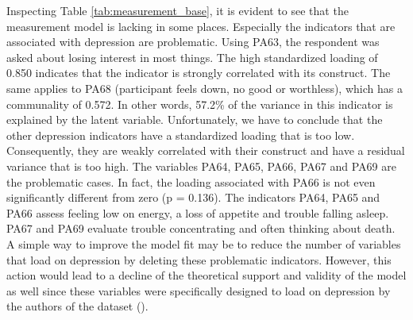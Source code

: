 \documentclass[11pt]{article}
\begin{document}
Inspecting Table \ref{tab:measurement_base}, it is evident to see that the
measurement model is lacking in some places. Especially the indicators that are
associated with depression are problematic.
Using PA63, the respondent was asked about losing interest in most things. The
high standardized loading of 0.850 indicates that the indicator is strongly
correlated with its construct. The same applies to PA68 (participant feels down,
no good or worthless), which has a communality of 0.572. In other words, 57.2\%
of the variance in this indicator is explained by the latent variable.
Unfortunately, we have to conclude that the other depression indicators have a
standardized loading that is too low. Consequently, they are weakly correlated
with their construct and have a residual variance that is too high. 
The variables PA64, PA65, PA66, PA67 and PA69 are the problematic cases. In
fact, the loading associated with PA66 is not even significantly different from
zero (p = 0.136). The indicators PA64, PA65 and PA66 assess feeling low on
energy, a loss of appetite and trouble falling asleep. PA67 and PA69 evaluate
trouble concentrating and often thinking about death. A simple way to improve
the model fit may be to reduce the number of variables that load on depression
by deleting these problematic indicators. However, this action would lead to a
decline of the theoretical support and validity of the model as well since these
variables were specifically designed to load on depression by the authors of the
dataset (\cite{hair2010}).
\end{document}

